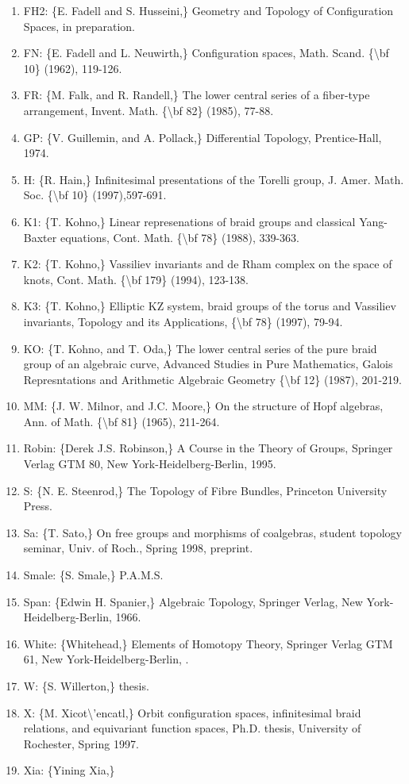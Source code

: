 \documentclass[11pt]{article}
\begin{document}
\begin{enumerate}[leftmargin=*]
  \item FH2: \{E. Fadell and S. Husseini,\} Geometry and Topology of Configuration Spaces, in preparation.
  \item FN: \{E. Fadell and L. Neuwirth,\} Configuration spaces, Math. Scand. \{\textbackslash{}bf 10\} (1962), 119-126.
  \item FR: \{M. Falk, and R. Randell,\} The lower central series of a fiber-type arrangement, Invent. Math. \{\textbackslash{}bf 82\} (1985), 77-88.
  \item GP: \{V. Guillemin, and A. Pollack,\} Differential Topology, Prentice-Hall, 1974.
  \item H: \{R. Hain,\} Infinitesimal presentations of the Torelli group, J. Amer. Math. Soc. \{\textbackslash{}bf 10\} (1997),597-691.
  \item K1: \{T. Kohno,\} Linear represenations of braid groups and classical Yang-Baxter equations, Cont. Math. \{\textbackslash{}bf 78\} (1988), 339-363.
  \item K2: \{T. Kohno,\} Vassiliev invariants and de Rham complex on the space of knots, Cont. Math. \{\textbackslash{}bf 179\} (1994), 123-138.
  \item K3: \{T. Kohno,\} Elliptic KZ system, braid groups of the torus and Vassiliev invariants, Topology and its Applications, \{\textbackslash{}bf 78\} (1997), 79-94.
  \item KO: \{T. Kohno, and T. Oda,\} The lower central series of the pure braid group of an algebraic curve, Advanced Studies in Pure Mathematics, Galois Represntations and Arithmetic Algebraic Geometry \{\textbackslash{}bf 12\} (1987), 201-219.
  \item MM: \{J. W. Milnor, and J.C. Moore,\} On the structure of Hopf algebras, Ann. of Math. \{\textbackslash{}bf 81\} (1965), 211-264.
  \item Robin: \{Derek J.S. Robinson,\} A Course in the Theory of Groups, Springer Verlag GTM 80, New York-Heidelberg-Berlin, 1995.
  \item S: \{N. E. Steenrod,\} The Topology of Fibre Bundles, Princeton University Press.
  \item Sa: \{T. Sato,\} On free groups and morphisms of coalgebras, student topology seminar, Univ. of Roch., Spring 1998, preprint.
  \item Smale: \{S. Smale,\} P.A.M.S.
  \item Span: \{Edwin H. Spanier,\} Algebraic Topology, Springer Verlag, New York-Heidelberg-Berlin, 1966.
  \item White: \{Whitehead,\} Elements of Homotopy Theory, Springer Verlag GTM 61, New York-Heidelberg-Berlin, .
  \item W: \{S. Willerton,\} thesis.
  \item X: \{M. Xicot\textbackslash{}'encatl,\} Orbit configuration spaces, infinitesimal braid relations, and equivariant function spaces, Ph.D. thesis, University of Rochester, Spring 1997.
  \item Xia: \{Yining Xia,\}
\end{enumerate}

% 
% 
\end{document}
